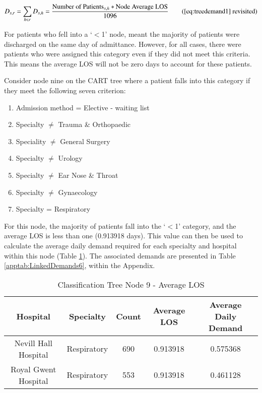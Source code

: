 \documentclass[../thesis.tex]{subfiles}
\begin{document}
\begin{equation}
        D_{s,r} = \sum\limits_{h \in r} D_{s,h} = \frac{\text{Number of Patients}_{s,h}*\text{Node Average LOS}}{1096} \tag{\ref{eq:treedemand1} revisited}\\
\end{equation}

For patients who fell into a `$<$1' node, meant the majority of patients were discharged on the same day of admittance. However, for all cases, there were patients who were assigned this category even if they did not meet this criteria. This means the average LOS will not be zero days to account for these patients.

Consider node nine on the CART tree where a patient falls into this category if they meet the following seven criterion:
\begin{enumerate}
    \item Admission method = Elective - waiting list
    \item Specialty $\neq$ Trauma \& Orthopaedic
    \item Speciality $\neq$ General Surgery
    \item Specialty $\neq$ Urology
    \item Specialty $\neq$ Ear Nose \& Throat
    \item Specialty $\neq$ Gynaecology
    \item Specialty = Respiratory
\end{enumerate}

For this node, the majority of patients fall into the `$<$1' category, and the average LOS is less than one (0.913918 days). This value can then be used to calculate the average daily demand required for each specialty and hospital within this node (Table \ref{tab:classnodeexample}). The associated demands are presented in Table \ref{apptab:LinkedDemands6}, within the Appendix.

\begin{table}[h!]
    \centering
    \begin{tabular}{ccccc}\toprule
        \textbf{Hospital} & \textbf{Specialty} & \textbf{Count} & \textbf{Average LOS} & \textbf{Average Daily Demand}  \\\midrule
         Nevill Hall Hospital & Respiratory &   690 & 0.913918 & 0.575368 \\
Royal Gwent Hospital & Respiratory &   553 &0.913918 & 0.461128 \\ \bottomrule
    \end{tabular}
    \caption{Classification Tree Node 9 - Average LOS}
    \label{tab:classnodeexample}
\end{table}
\end{document}

